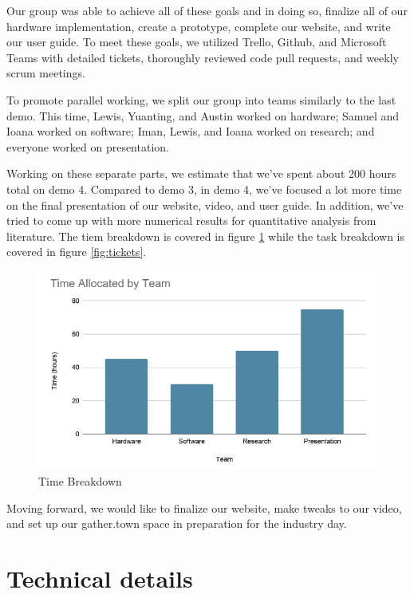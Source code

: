 \documentclass{article}
\begin{document}
Our group was able to achieve all of these goals and in doing so, finalize all of our hardware implementation, create a prototype, complete our website, and write our user guide. To meet these goals, we utilized Trello, Github, and Microsoft Teams with detailed tickets, thoroughly reviewed code pull requests, and weekly scrum meetings.

To promote parallel working, we split our group into teams similarly to the last demo. This time, Lewis, Yuanting, and Austin worked on hardware; Samuel and Ioana worked on software; Iman, Lewis, and Ioana worked on research; and everyone worked on presentation.

Working on these separate parts, we estimate that we've spent about 200 hours total on demo 4. Compared to demo 3, in demo 4, we've focused a lot more time on the final presentation of our website, video, and user guide. In addition, we've tried to come up with more numerical results for quantitative analysis from literature. The tiem breakdown is covered in figure \ref{fig:time-fig} while the task breakdown is covered in figure \ref{fig:tickets}.

\begin{figure}[tb]
\vskip 5mm
\begin{center}
\centerline{\includegraphics[width=\columnwidth]{figs/time-breakdown}}
\caption{Time Breakdown}
\label{fig:time-fig}
\end{center}
\vskip -5mm
\end{figure} 

Moving forward, we would like to finalize our website, make tweaks to our video, and set up our gather.town space in preparation for the industry day.

\section{Technical details}
\end{document}
